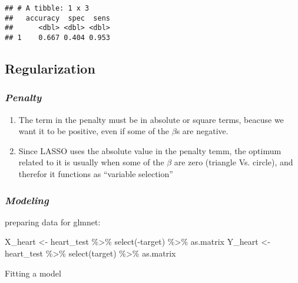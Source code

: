 \documentclass[
]{article}
\newenvironment{Shaded}{\begin{snugshade}}{\end{snugshade}}
\newcommand{\FunctionTok}[1]{\textcolor[rgb]{0.00,0.00,0.00}{#1}}
\newcommand{\NormalTok}[1]{#1}
\newcommand{\OtherTok}[1]{\textcolor[rgb]{0.56,0.35,0.01}{#1}}
\newcommand{\SpecialCharTok}[1]{\textcolor[rgb]{0.00,0.00,0.00}{#1}}
\providecommand{\tightlist}{%
  \setlength{\itemsep}{0pt}\setlength{\parskip}{0pt}}
\begin{document}
\begin{verbatim}
## # A tibble: 1 x 3
##   accuracy  spec  sens
##      <dbl> <dbl> <dbl>
## 1    0.667 0.404 0.953
\end{verbatim}

\hypertarget{regularization}{%
\subsection{Regularization}\label{regularization}}

\hypertarget{penalty}{%
\subsubsection{\texorpdfstring{\emph{Penalty}}{Penalty}}\label{penalty}}

\begin{enumerate}
\def\labelenumi{\arabic{enumi}.}
\tightlist
\item
  The term in the penalty must be in absolute or square terms, beacuse
  we want it to be positive, even if some of the \(\beta\)s are
  negative.
\item
  Since LASSO uses the absolute value in the penalty temm, the optimum
  related to it is usually when some of the \(\beta\) are zero (triangle
  Vs. circle), and therefor it functions as ``variable selection''
\end{enumerate}

\hypertarget{modeling}{%
\subsubsection{\texorpdfstring{\emph{Modeling}}{Modeling}}\label{modeling}}

preparing data for glmnet:

\begin{Shaded}
\begin{Highlighting}[]
\NormalTok{X\_heart }\OtherTok{\textless{}{-}}\NormalTok{ heart\_test }\SpecialCharTok{\%\textgreater{}\%} \FunctionTok{select}\NormalTok{(}\SpecialCharTok{{-}}\NormalTok{target) }\SpecialCharTok{\%\textgreater{}\%}\NormalTok{ as.matrix}
\NormalTok{Y\_heart }\OtherTok{\textless{}{-}}\NormalTok{ heart\_test }\SpecialCharTok{\%\textgreater{}\%} \FunctionTok{select}\NormalTok{(target) }\SpecialCharTok{\%\textgreater{}\%}\NormalTok{ as.matrix}
\end{Highlighting}
\end{Shaded}

Fitting a model
\end{document}
